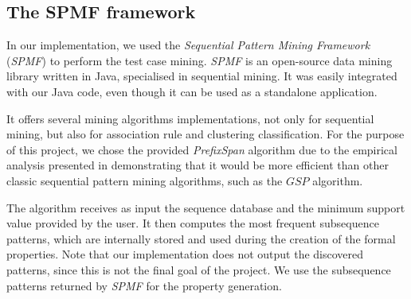 \subsection{The SPMF framework}
\label{sec-spmf}

In our implementation, we used the \textit{Sequential Pattern Mining Framework} (\textit{SPMF})\cite{spmf} to perform the test case mining. \textit{SPMF} is an open-source data mining library written in Java, specialised in sequential mining. It was easily integrated with our Java code, even though it can be used as a standalone application.

It offers several mining algorithms implementations, not only for sequential mining, but also for association rule and clustering classification. For the purpose of this project, we chose the provided \textit{PrefixSpan} algorithm due to the empirical analysis presented in \cite{Pei} demonstrating that it would be more efficient than other classic sequential pattern mining algorithms, such as the $GSP$ algorithm.

The algorithm receives as input the sequence database and the minimum support value provided by the user. It then computes the most frequent subsequence patterns, which are internally stored and used during the creation of the formal properties. Note that our implementation does not output the discovered patterns, since this is not the final goal of the project. We use the subsequence patterns returned by \textit{SPMF} for the property generation. 


